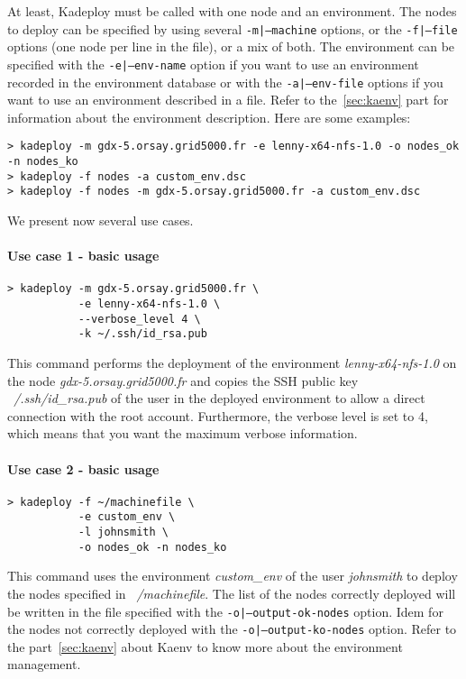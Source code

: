 \documentclass[a4wide,10pt,oneside]{book}
\begin{document}
At least, Kadeploy must be called with one node and an environment. The nodes to deploy can be specified by using several \texttt{-m|--machine} options, or the \texttt{-f|--file} options (one node per line in the file), or a mix of both.
The environment can be specified with the \texttt{-e|--env-name} option if you want to use an environment recorded in the environment database or with the \texttt{-a|--env-file} options if you want to use an environment described in a file. Refer to the~\ref{sec:kaenv} part for information about the environment description. Here are some examples:
\begin{verbatim}
> kadeploy -m gdx-5.orsay.grid5000.fr -e lenny-x64-nfs-1.0 -o nodes_ok -n nodes_ko
> kadeploy -f nodes -a custom_env.dsc
> kadeploy -f nodes -m gdx-5.orsay.grid5000.fr -a custom_env.dsc
\end{verbatim}

We present now several use cases.

\paragraph{Use case 1 - basic usage}
\begin{verbatim}
> kadeploy -m gdx-5.orsay.grid5000.fr \
           -e lenny-x64-nfs-1.0 \
           --verbose_level 4 \
           -k ~/.ssh/id_rsa.pub
\end{verbatim}
This command performs the deployment of the environment \textit{lenny-x64-nfs-1.0} on the node \textit{gdx-5.orsay.grid5000.fr} and copies the SSH public key \textit{~/.ssh/id\_rsa.pub} of the user in the deployed environment to allow a direct connection with the root account. Furthermore, the verbose level is set to 4, which means that you want the maximum verbose information.

\paragraph{Use case 2 - basic usage}
\begin{verbatim}
> kadeploy -f ~/machinefile \
           -e custom_env \
           -l johnsmith \
           -o nodes_ok -n nodes_ko
\end{verbatim}
This command uses the environment \textit{custom\_env} of the user \textit{johnsmith} to deploy the nodes specified in \textit{~/machinefile}. The list of the nodes correctly deployed will be written in the file specified with the \texttt{-o|--output-ok-nodes} option. Idem for the nodes not correctly deployed with the \texttt{-o|--output-ko-nodes} option. Refer to the part~\ref{sec:kaenv} about Kaenv to know more about the environment management.
\end{document}
